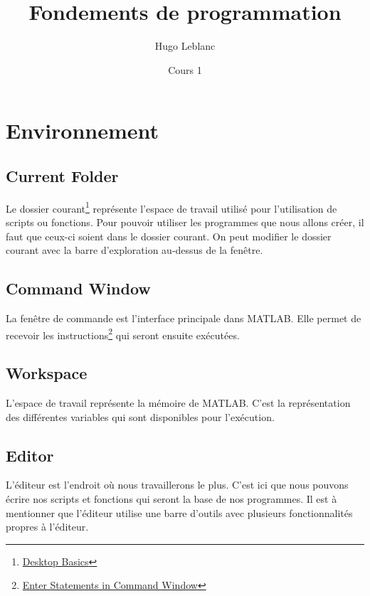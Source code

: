 \documentclass[]{tufte-handout}
\title{Fondements de programmation}
\author{Hugo Leblanc}
\date{Cours 1}
\begin{document}
\maketitle

\hypertarget{environnement}{%
\section{Environnement}\label{environnement}}

\hypertarget{current-folder}{%
\subsection{Current Folder}\label{current-folder}}

Le dossier courant\footnote{\href{https://www.mathworks.com/help/matlab/learn_matlab/desktop.html}{Desktop
  Basics}} représente l'espace de travail utilisé pour l'utilisation de
scripts ou fonctions. Pour pouvoir utiliser les programmes que nous
allons créer, il faut que ceux-ci soient dans le dossier courant. On
peut modifier le dossier courant avec la barre d'exploration au-dessus
de la fenêtre.

\hypertarget{command-window}{%
\subsection{Command Window}\label{command-window}}

La fenêtre de commande est l'interface principale dans MATLAB. Elle
permet de recevoir les instructions\footnote{\href{https://www.mathworks.com/help/matlab/matlab_env/enter-statements-in-command-window.html}{Enter
  Statements in Command Window}} qui seront ensuite exécutées.

\hypertarget{workspace}{%
\subsection{Workspace}\label{workspace}}

L'espace de travail représente la mémoire de MATLAB. C'est la
représentation des différentes variables qui sont disponibles pour
l'exécution.

\hypertarget{editor}{%
\subsection{Editor}\label{editor}}

L'éditeur est l'endroit où nous travaillerons le plus. C'est ici que
nous pouvons écrire nos scripts et fonctions qui seront la base de nos
programmes. Il est à mentionner que l'éditeur utilise une barre d'outils
avec plusieurs fonctionnalités propres à l'éditeur.
\end{document}
